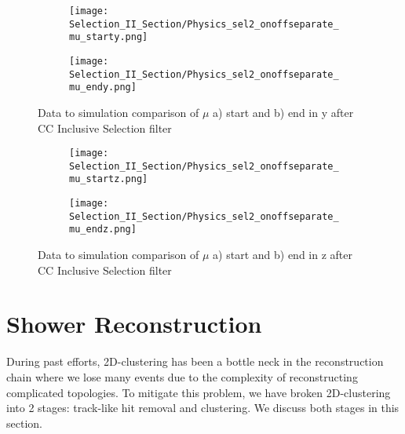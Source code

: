 \begin{figure}[t!]
\centering
  \begin{subfigure}[t]{0.3\textwidth}
    \centering
\texttt{[image: Selection\_II\_Section/Physics\_sel2\_onoffseparate\_mu\_starty.png]}
   \caption{ }
  \end{subfigure} 
  \hspace{30 mm}
  \begin{subfigure}[t]{0.3\textwidth}
    \centering
\texttt{[image: Selection\_II\_Section/Physics\_sel2\_onoffseparate\_mu\_endy.png]}
   \caption{ }
  \end{subfigure} 
\caption{ Data to simulation comparison of $\mu$ a) start and b) end in y after CC Inclusive Selection filter }
\label{fig:physics_sel2_y}
\end{figure}

\begin{figure}[t!]
\centering
  \begin{subfigure}[t]{0.3\textwidth}
    \centering
\texttt{[image: Selection\_II\_Section/Physics\_sel2\_onoffseparate\_mu\_startz.png]}
   \caption{ }
  \end{subfigure} 
  \hspace{30mm}
  \begin{subfigure}[t]{0.3\textwidth}
    \centering
\texttt{[image: Selection\_II\_Section/Physics\_sel2\_onoffseparate\_mu\_endz.png]}
   \caption{ }
  \end{subfigure} 

\caption{ Data to simulation comparison of $\mu$ a) start and b) end in z after CC Inclusive Selection filter }
\label{fig:physics_sel2_z}
\end{figure}




\clearpage
\section{Shower Reconstruction}
During past efforts, 2D-clustering has been a bottle neck in the reconstruction chain where we lose many events due to the complexity of reconstructing complicated topologies. To mitigate this problem, we have broken 2D-clustering into 2 stages: track-like hit removal and clustering. We discuss both stages in this section.

